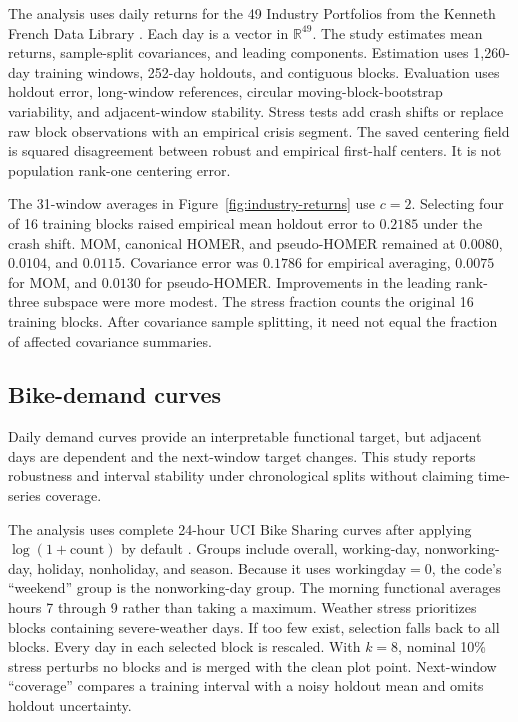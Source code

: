 \documentclass[twoside]{article}
\theoremstyle{definition}
\newcommand{\R}{\mathbb R}
\begin{document}
The analysis uses daily returns for the 49 Industry Portfolios from the Kenneth French Data Library \citep{fama_1993_CommonRiskFactors}. Each day is a vector in $\R^{49}$. The study estimates mean returns, sample-split covariances, and leading components. Estimation uses 1,260-day training windows, 252-day holdouts, and contiguous blocks. Evaluation uses holdout error, long-window references, circular moving-block-bootstrap variability, and adjacent-window stability. Stress tests add crash shifts or replace raw block observations with an empirical crisis segment. The saved centering field is squared disagreement between robust and empirical first-half centers. It is not population rank-one centering error.

The 31-window averages in Figure~\ref{fig:industry-returns} use $c=2$. Selecting four of 16 training blocks raised empirical mean holdout error to $0.2185$ under the crash shift. MOM, canonical HOMER, and pseudo-HOMER remained at $0.0080$, $0.0104$, and $0.0115$. Covariance error was $0.1786$ for empirical averaging, $0.0075$ for MOM, and $0.0130$ for pseudo-HOMER. Improvements in the leading rank-three subspace were more modest. The stress fraction counts the original 16 training blocks. After covariance sample splitting, it need not equal the fraction of affected covariance summaries.

\subsection{Bike-demand curves}

Daily demand curves provide an interpretable functional target, but adjacent days are dependent and the next-window target changes. This study reports robustness and interval stability under chronological splits without claiming time-series coverage.

The analysis uses complete 24-hour UCI Bike Sharing curves after applying $\log(1+\mathrm{count})$ by default \citep{fanaee-t_2014_EventLabelingCombining}. Groups include overall, working-day, nonworking-day, holiday, nonholiday, and season. Because it uses $\mathrm{workingday}=0$, the code's ``weekend'' group is the nonworking-day group. The morning functional averages hours 7 through 9 rather than taking a maximum. Weather stress prioritizes blocks containing severe-weather days. If too few exist, selection falls back to all blocks. Every day in each selected block is rescaled. With $k=8$, nominal 10\% stress perturbs no blocks and is merged with the clean plot point. Next-window ``coverage'' compares a training interval with a noisy holdout mean and omits holdout uncertainty.
\end{document}
